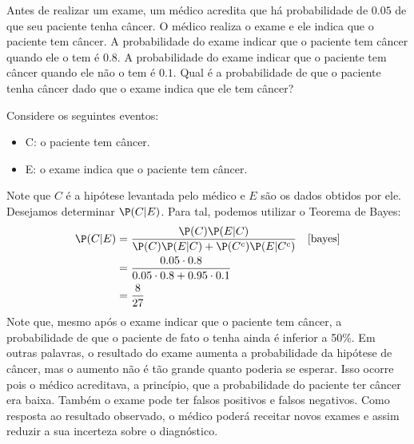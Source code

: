 \begin{example}
 \label{exemplo:exame}
 Antes de realizar um exame, 
 um médico acredita que há probabilidade de 
 $0.05$ de que seu paciente tenha câncer.
 O médico realiza o exame e ele indica que
 o paciente tem câncer.
 A probabilidade do exame indicar que 
 o paciente tem câncer quando ele o tem é $0.8$.
 A probabilidade do exame indicar que 
 o paciente tem câncer quando
 ele não o tem é $0.1$.
 Qual é a probabilidade de que o paciente tenha
 câncer dado que o exame indica que
 ele tem câncer?

 Considere os seguintes eventos:
 \begin{itemize}
  \item C: o paciente tem câncer.
  \item E: o exame indica que o paciente tem câncer.
 \end{itemize}
 Note que $C$ é a hipótese levantada pelo médico e
 $E$ são os dados obtidos por ele. 
 Desejamos determinar $\P(C|E)$.
 Para tal, podemos utilizar o Teorema de Bayes:
 \begin{align*}
  \P(C|E)
  &= \frac{\P(C)\P(E|C)}
  {\P(C)\P(E|C) +\P(C^{c})\P(E|C^{c})}
  & \Cref{bayes} \\
  &= \frac{0.05 \cdot 0.8}
  {0.05 \cdot 0.8 + 0.95 \cdot 0.1} \\
  &= \frac{8}{27} 
 \end{align*}
 Note que, mesmo após o exame indicar que 
 o paciente tem câncer, a 
 probabilidade de que o paciente de fato o 
 tenha ainda é inferior a 50\%.
 Em outras palavras, o resultado do exame aumenta a
 probabilidade da hipótese de câncer, mas 
 o aumento não é tão grande quanto poderia se esperar.
 Isso ocorre pois o médico acreditava, a princípio, 
 que a probabilidade do paciente ter câncer era baixa.
 Também o exame pode ter 
 falsos positivos e falsos negativos.
 Como resposta ao resultado observado, 
 o médico poderá receitar novos exames
 e assim reduzir a sua incerteza sobre o diagnóstico.
\end{example}

